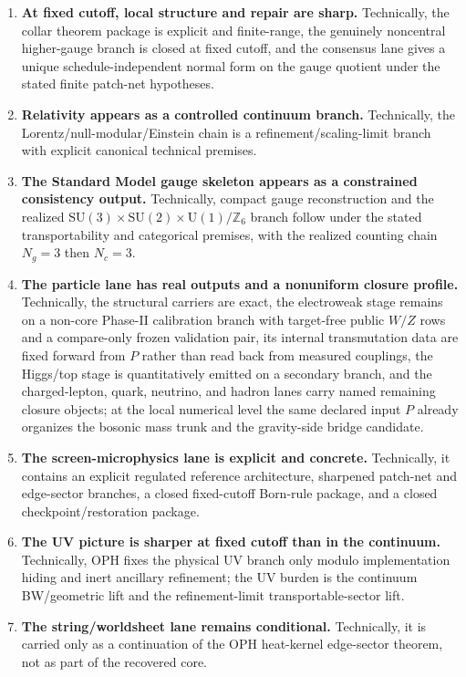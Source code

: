 \documentclass[11pt]{article}
\newcommand{\SU}{\mathrm{SU}}
\newcommand{\U}{\mathrm{U}}
\begin{document}
\begin{enumerate}[leftmargin=2em]
\item \textbf{At fixed cutoff, local structure and repair are sharp.} Technically, the
collar theorem package is explicit and finite-range, the genuinely noncentral higher-gauge branch
is closed at fixed cutoff, and the consensus lane gives a unique schedule-independent normal form
on the gauge quotient under the stated finite patch-net hypotheses.
\item \textbf{Relativity appears as a controlled continuum branch.}
Technically, the Lorentz/null-modular/Einstein chain is a refinement/scaling-limit branch with
explicit canonical technical premises.
\item \textbf{The Standard Model gauge skeleton appears as a constrained consistency output.}
Technically, compact gauge reconstruction and the realized
\(\SU(3)\times\SU(2)\times\U(1)/\mathbb Z_6\) branch follow under the stated transportability and
categorical premises, with the realized counting chain \(N_g=3\) then \(N_c=3\).
\item \textbf{The particle lane has real outputs and a nonuniform closure profile.}
Technically, the structural carriers are exact, the electroweak stage remains on a non-core
Phase-II calibration branch with target-free public \(W/Z\) rows and a compare-only frozen
validation pair, its internal transmutation data are fixed forward from \(P\) rather than read
back from measured couplings, the Higgs/top stage is quantitatively emitted on a secondary branch,
and the charged-lepton, quark, neutrino, and hadron lanes carry named remaining closure objects;
at the local numerical level the same declared input \(P\) already organizes the bosonic mass
trunk and the gravity-side bridge candidate.
\item \textbf{The screen-microphysics lane is explicit and concrete.} Technically, it
contains an explicit regulated reference architecture, sharpened patch-net and edge-sector
branches, a closed fixed-cutoff Born-rule package, and a closed checkpoint/restoration package.
\item \textbf{The UV picture is sharper at fixed cutoff than in the continuum.} Technically, OPH
fixes the physical UV branch only modulo implementation hiding and inert ancillary refinement; the
UV burden is the continuum BW/geometric lift and the refinement-limit transportable-sector
lift.
\item \textbf{The string/worldsheet lane remains conditional.} Technically, it is carried only as
a continuation of the OPH heat-kernel edge-sector theorem, not as part of the recovered core.
\end{enumerate}
\end{document}
